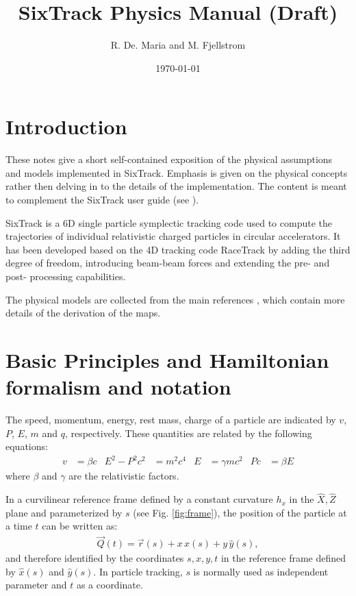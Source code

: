 \documentclass[english]{article}
\begin{document}
\author{R. De. Maria and M. Fjellstrom}
\title{SixTrack Physics Manual (Draft)}
\date{\today}

\maketitle

\tableofcontents
\newpage

\section{Introduction}

These notes give a short self-contained exposition of the physical assumptions
and models implemented in SixTrack. Emphasis is given on the physical concepts
rather then delving in to the details of the implementation.  The content is
meant to complement the SixTrack user guide (see \cite{user_guide}).

SixTrack is a 6D single particle symplectic tracking code used to compute the
trajectories of individual relativistic charged particles in circular
accelerators. It has been developed based on the 4D tracking code RaceTrack
\cite{racetrack} by adding the third degree of freedom, introducing beam-beam
forces and extending the pre- and post- processing capabilities.

The physical models are collected from the main references
\cite{ripken85,barber87,ripken95,heinemann95,barber96,beam_beam,rf_multipoles},
which contain more details of the derivation of the maps.

\section{Basic Principles and Hamiltonian formalism and notation}


The speed, momentum, energy, rest mass, charge of a particle are indicated
by $v$, $P$, $E$, $m$ and $q$, respectively.  These quantities are
related by the following equations:
\begin{align}
  v&=\beta c &
  E^2-P^2c^2&=m^2c^4 &
  E & = \gamma mc^2 &
  Pc & =\beta E
\end{align}
where $\beta$ and $\gamma$ are the relativistic factors.

In a curvilinear reference frame defined by a constant curvature $h_x$ in the
$\hat X, \hat Z$ plane and parameterized by $s$  (see Fig. \ref{fig:frame}), the
position of the particle at a time $t$ can be written as:
\begin{align}
  \vec Q(t)= \vec r(s) + x \,\hat x(s) + y\, \hat y(s),
\end{align}
and therefore identified by the coordinates $s, x, y, t$ in the reference frame
defined by $\hat x(s)$ and $\hat y(s)$. In particle tracking, $s$ is normally
used as independent parameter and $t$ as a coordinate.
\end{document}
